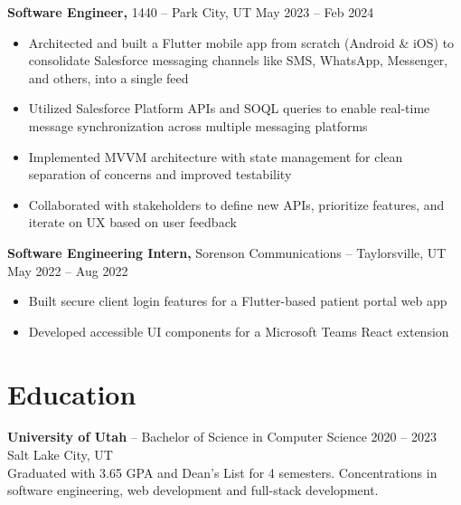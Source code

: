 \documentclass[11pt]{article}       %
\begin{document}
\textbf{Software Engineer,} 1440 -- Park City, UT \hfill May 2023 -- Feb 2024 \\
\vspace{-9pt}
\begin{itemize}
  \item Architected and built a Flutter mobile app from scratch (Android \& iOS) to consolidate Salesforce messaging channels like SMS, WhatsApp, Messenger, and others, into a single feed
  \item Utilized Salesforce Platform APIs and SOQL queries to enable real-time message synchronization across multiple messaging platforms
  \item Implemented MVVM architecture with state management for clean separation of concerns and improved testability
  \item Collaborated with stakeholders to define new APIs, prioritize features, and iterate on UX based on user feedback
\end{itemize}

\textbf{Software Engineering Intern,} Sorenson Communications -- Taylorsville, UT \hfill May 2022 -- Aug 2022 \\
\vspace{-9pt}
\begin{itemize}
  \item Built secure client login features for a Flutter-based patient portal web app
  \item Developed accessible UI components for a Microsoft Teams React extension
\end{itemize}


\vspace{-18.5pt}

\section*{Education}
\textbf{University of Utah} -- Bachelor of Science in Computer Science \hfill 2020 -- 2023 \\
Salt Lake City, UT \\
Graduated with 3.65 GPA and Dean's List for 4 semesters. Concentrations in software engineering, web development and full-stack development.
\end{document}
